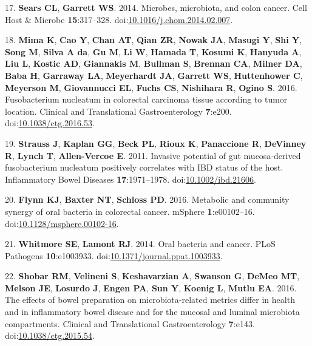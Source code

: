 \documentclass[11pt,]{article}
\begin{document}
\hypertarget{ref-Sears2014}{}
17. \textbf{Sears CL}, \textbf{Garrett WS}. 2014. Microbes, microbiota,
and colon cancer. Cell Host \& Microbe \textbf{15}:317--328.
doi:\href{https://doi.org/10.1016/j.chom.2014.02.007}{10.1016/j.chom.2014.02.007}.

\hypertarget{ref-Mima2016}{}
18. \textbf{Mima K}, \textbf{Cao Y}, \textbf{Chan AT}, \textbf{Qian ZR},
\textbf{Nowak JA}, \textbf{Masugi Y}, \textbf{Shi Y}, \textbf{Song M},
\textbf{Silva A da}, \textbf{Gu M}, \textbf{Li W}, \textbf{Hamada T},
\textbf{Kosumi K}, \textbf{Hanyuda A}, \textbf{Liu L}, \textbf{Kostic
AD}, \textbf{Giannakis M}, \textbf{Bullman S}, \textbf{Brennan CA},
\textbf{Milner DA}, \textbf{Baba H}, \textbf{Garraway LA},
\textbf{Meyerhardt JA}, \textbf{Garrett WS}, \textbf{Huttenhower C},
\textbf{Meyerson M}, \textbf{Giovannucci EL}, \textbf{Fuchs CS},
\textbf{Nishihara R}, \textbf{Ogino S}. 2016. Fusobacterium nucleatum in
colorectal carcinoma tissue according to tumor location. Clinical and
Translational Gastroenterology \textbf{7}:e200.
doi:\href{https://doi.org/10.1038/ctg.2016.53}{10.1038/ctg.2016.53}.

\hypertarget{ref-Strauss2011}{}
19. \textbf{Strauss J}, \textbf{Kaplan GG}, \textbf{Beck PL},
\textbf{Rioux K}, \textbf{Panaccione R}, \textbf{DeVinney R},
\textbf{Lynch T}, \textbf{Allen-Vercoe E}. 2011. Invasive potential of
gut mucosa-derived fusobacterium nucleatum positively correlates with
IBD status of the host. Inflammatory Bowel Diseases
\textbf{17}:1971--1978.
doi:\href{https://doi.org/10.1002/ibd.21606}{10.1002/ibd.21606}.

\hypertarget{ref-Flynn2016}{}
20. \textbf{Flynn KJ}, \textbf{Baxter NT}, \textbf{Schloss PD}. 2016.
Metabolic and community synergy of oral bacteria in colorectal cancer.
mSphere \textbf{1}:e00102--16.
doi:\href{https://doi.org/10.1128/msphere.00102-16}{10.1128/msphere.00102-16}.

\hypertarget{ref-Whitmore2014}{}
21. \textbf{Whitmore SE}, \textbf{Lamont RJ}. 2014. Oral bacteria and
cancer. PLoS Pathogens \textbf{10}:e1003933.
doi:\href{https://doi.org/10.1371/journal.ppat.1003933}{10.1371/journal.ppat.1003933}.

\hypertarget{ref-Shobar2016}{}
22. \textbf{Shobar RM}, \textbf{Velineni S}, \textbf{Keshavarzian A},
\textbf{Swanson G}, \textbf{DeMeo MT}, \textbf{Melson JE},
\textbf{Losurdo J}, \textbf{Engen PA}, \textbf{Sun Y}, \textbf{Koenig
L}, \textbf{Mutlu EA}. 2016. The effects of bowel preparation on
microbiota-related metrics differ in health and in inflammatory bowel
disease and for the mucosal and luminal microbiota compartments.
Clinical and Translational Gastroenterology \textbf{7}:e143.
doi:\href{https://doi.org/10.1038/ctg.2015.54}{10.1038/ctg.2015.54}.
\end{document}

